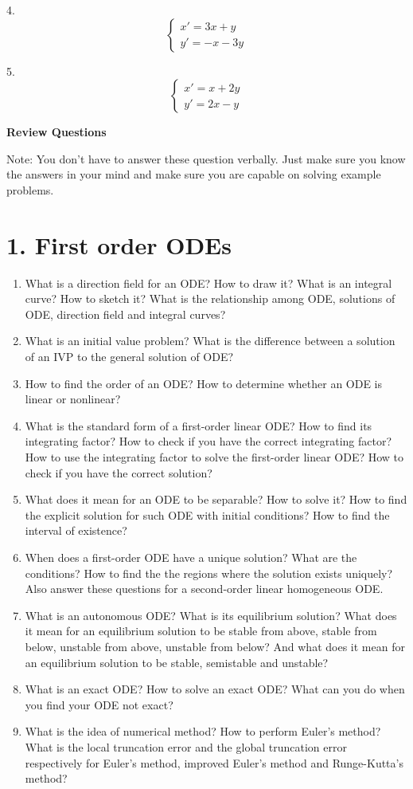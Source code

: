 \documentclass[11pt]{article}
\begin{document}
4. $$\left\{\begin{array}{l}
x' = 3x + y\\
y' = -x -3y
\end{array}\right.$$

5. $$\left\{\begin{array}{l}
x' = x + 2y\\
y' = 2x - y
\end{array}\right.$$


\newpage 

\begin{center}
\Large{\textbf{Review Questions}}
\end{center}

Note: You don't have to answer these question verbally. Just make sure you know the answers
in your mind and make sure you are capable on solving example problems.

\section*{1. First order ODEs}

\begin{enumerate}
\item What is a direction field for an ODE? How to draw it? What is an integral curve? How
to sketch it? What is the relationship among ODE, solutions of ODE, direction field and
integral curves? 
\item What is an initial value problem? What is the difference between a solution of an IVP
to the general solution of ODE? 
\item How to find the order of an ODE? How to determine whether an ODE is linear or
nonlinear? 
\item What is the standard form of a first-order linear ODE? How to find its integrating factor? How to check if you have the correct integrating factor? How to use the integrating factor to
solve the first-order linear ODE? How to check if you have the correct solution? 
\item What does it mean for an ODE to be separable? How to solve it? How to find the explicit solution for such ODE with initial conditions? How to find the interval of existence? 
\item When does a first-order ODE have a unique solution? What are the conditions? How to find the the regions where the solution exists uniquely? Also answer these questions for a second-order linear homogeneous ODE. 
\item What is an autonomous ODE? What is its equilibrium solution? What does it mean for an equilibrium solution to be stable from above, stable from below, unstable from above, unstable from below? And what does it mean for an equilibrium solution to be stable, semistable and unstable? 
\item What is an exact ODE? How to solve an exact ODE? What can you do when you find
your ODE not exact? 
\item What is the idea of numerical method? How to perform Euler's method? What is the local truncation error and the global truncation error respectively for Euler's method, improved Euler's method and Runge-Kutta's method? 
\end{enumerate}
\end{document}
